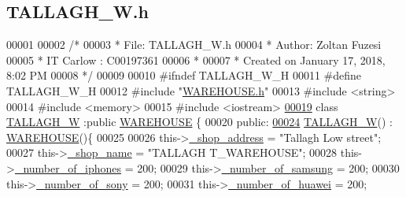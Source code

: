 \hypertarget{_t_a_l_l_a_g_h___w_8h_source}{}\subsection{T\+A\+L\+L\+A\+G\+H\+\_\+\+W.\+h}

\begin{DoxyCode}
00001 
00002 \textcolor{comment}{/* }
00003 \textcolor{comment}{ * File:   TALLAGH\_W.h}
00004 \textcolor{comment}{ * Author: Zoltan Fuzesi}
00005 \textcolor{comment}{ * IT Carlow : C00197361}
00006 \textcolor{comment}{ *}
00007 \textcolor{comment}{ * Created on January 17, 2018, 8:02 PM}
00008 \textcolor{comment}{ */}
00009 
00010 \textcolor{preprocessor}{#ifndef TALLAGH\_W\_H}
00011 \textcolor{preprocessor}{#define TALLAGH\_W\_H}
00012 \textcolor{preprocessor}{#include "\hyperlink{_w_a_r_e_h_o_u_s_e_8h}{WAREHOUSE.h}"}
00013 \textcolor{preprocessor}{#include <string>}
00014 \textcolor{preprocessor}{#include <memory>}
00015 \textcolor{preprocessor}{#include <iostream>}
\hypertarget{_t_a_l_l_a_g_h___w_8h_source.tex_l00019}{}\hyperlink{class_t_a_l_l_a_g_h___w}{00019} \textcolor{keyword}{class }\hyperlink{class_t_a_l_l_a_g_h___w}{TALLAGH\_W} :\textcolor{keyword}{public} \hyperlink{class_w_a_r_e_h_o_u_s_e}{WAREHOUSE} \{
00020 \textcolor{keyword}{public}:
\hypertarget{_t_a_l_l_a_g_h___w_8h_source.tex_l00024}{}\hyperlink{class_t_a_l_l_a_g_h___w_aeafc411edee7a3e8bfcc54fa478e2104_aeafc411edee7a3e8bfcc54fa478e2104}{00024}     \hyperlink{class_t_a_l_l_a_g_h___w_aeafc411edee7a3e8bfcc54fa478e2104_aeafc411edee7a3e8bfcc54fa478e2104}{TALLAGH\_W}() : \hyperlink{class_w_a_r_e_h_o_u_s_e}{WAREHOUSE}()\{
00025         
00026         this->\hyperlink{class_t_a_l_l_a_g_h___w_a268003f2cd359fa50c6061f1ad011c67_a268003f2cd359fa50c6061f1ad011c67}{\_shop\_address} = \textcolor{stringliteral}{"Tallagh Low street"};
00027         this->\hyperlink{class_t_a_l_l_a_g_h___w_a2d63785f290e8be76f3c4543e5df9508_a2d63785f290e8be76f3c4543e5df9508}{\_shop\_name} = \textcolor{stringliteral}{"TALLAGH T\_WAREHOUSE"};
00028         this->\hyperlink{class_t_a_l_l_a_g_h___w_ad8a7847f895cd13b45331e4f3cd20c2e_ad8a7847f895cd13b45331e4f3cd20c2e}{\_number\_of\_iphones} = 200;
00029         this->\hyperlink{class_t_a_l_l_a_g_h___w_a2438dbd2a390036bfd35f46a63b5b9bf_a2438dbd2a390036bfd35f46a63b5b9bf}{\_number\_of\_samsung} = 200;
00030         this->\hyperlink{class_t_a_l_l_a_g_h___w_ab101d3ac8747eef48371cd9078d2366e_ab101d3ac8747eef48371cd9078d2366e}{\_number\_of\_sony} = 200;
00031         this->\hyperlink{class_t_a_l_l_a_g_h___w_ab966ff243f14eefc346e0b031f21c9b6_ab966ff243f14eefc346e0b031f21c9b6}{\_number\_of\_huawei} = 200;

\end{DoxyCode}
